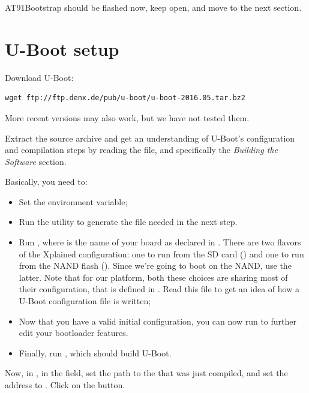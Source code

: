 AT91Bootstrap should be flashed now, keep  open, and move to
the next section.

\section{U-Boot setup}

Download U-Boot:

\begin{verbatim}
wget ftp://ftp.denx.de/pub/u-boot/u-boot-2016.05.tar.bz2
\end{verbatim}


More recent versions may also work, but we have not tested them.

Extract the source archive and get an understanding of U-Boot's
configuration and compilation steps by reading the  file,
and specifically the {\em Building the Software} section.

Basically, you need to:

\begin{itemize}

\item Set the  environment variable;

\item Run the  utility to generate
      the  file needed in the next step.
\item Run , where  is the
  name of your board as declared in . There are
  two flavors of the Xplained configuration: one to run from the SD card
  () and one to run from the NAND flash
  (). Since we're going to boot on
  the NAND, use the latter. Note that for our platform, both these
  choices are sharing most of their configuration, that is defined in
  . Read this file to get an
  idea of how a U-Boot configuration file is written;

\item Now that you have a valid initial configuration, you can now
  run  to further edit your bootloader features. 

\item Finally, run , which should build U-Boot.

\end{itemize}

Now, in , in the  field, set the path to
the  that was just compiled, and set the address to
. Click on the  button.

